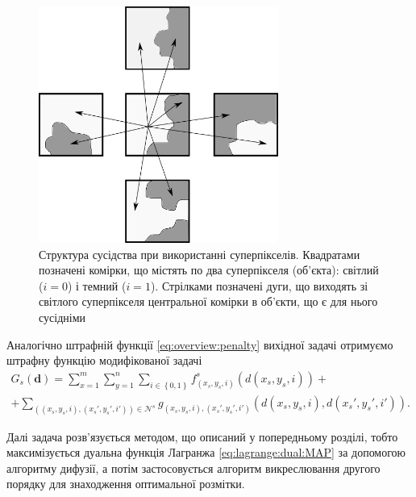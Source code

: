 \begin{figure}[h]
  \centering
  \includegraphics[width=0.7\textwidth]{images/neighbours_superpixel}
  \caption{Структура сусідства при використанні суперпікселів.
           Квадратами позначені комірки,
           що містять по два суперпікселя (об'єкта):
           світлий ($i = 0$) і темний ($i = 1$).
           Стрілками позначені дуги,
           що виходять зі світлого суперпікселя центральної комірки в об'єкти,
           що є для нього сусідніми}
  \label{fig:superpixel:neighbors}
\end{figure}

Аналогічно штрафній функції \eqref{eq:overview:penalty}
вихідної задачі отримуємо штрафну функцію модифікованої задачі
\begin{equation*}
\begin{gathered}
    G_s \left( \pmb{d} \right)
    = \sum \limits_{x = 1}^{m}
        \sum \limits_{y = 1}^{n}
            \sum \limits_{i \in \left\{ 0, 1 \right\}}
                f_{\left( x_s, y_s, i \right)}^s
                    \left( d \left(x_s, y_s, i \right) \right) + \\
    + \sum \limits_{\left( \left(x_s, y_s, i \right), \left(x_s', y_s', i' \right) \right) \in \mathcal{N}^s}
            g_{\left(x_s, y_s, i \right), \left(x_s', y_s', i' \right)} \left(
                d \left( x_s, y_s, i \right), d \left( x_s', y_s', i' \right)
            \right).
\end{gathered}
\end{equation*}

Далі задача розв'язується методом, що описаний у попередньому розділі,
тобто максимізується дуальна функція Лагранжа \eqref{eq:lagrange:dual:MAP}
за допомогою алгоритму дифузії,
а потім застосовується алгоритм викреслювання
другого порядку для знаходження оптимальної розмітки.

